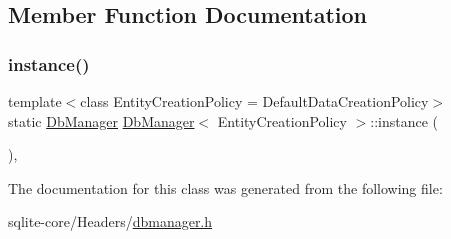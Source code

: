 \subsection{Member Function Documentation}
\mbox{\label{classDbManager_ab470cdc17355eec8153533c74d022298}} 
\subsubsection{\texorpdfstring{instance()}{instance()}}
{\footnotesize\ttfamily template$<$class Entity\+Creation\+Policy  = Default\+Data\+Creation\+Policy$>$ \\
static \mbox{\hyperlink{classDbManager}{Db\+Manager}} \mbox{\hyperlink{classDbManager}{Db\+Manager}}$<$ Entity\+Creation\+Policy $>$\+::instance (\begin{DoxyParamCaption}{ }\end{DoxyParamCaption})\hspace{0.3cm}{\ttfamily [inline]}, {\ttfamily [static]}}



The documentation for this class was generated from the following file\+:\begin{DoxyCompactItemize}
\item 
sqlite-\/core/\+Headers/\mbox{\hyperlink{dbmanager_8h}{dbmanager.\+h}}\end{DoxyCompactItemize}
